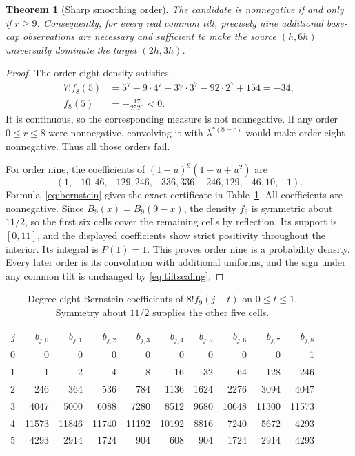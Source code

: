 \documentclass[11pt,a4paper]{article}
\newtheorem{theorem}{Theorem}[section]\newtheorem{lemma}[theorem]{Lemma}
\theoremstyle{remark}\newtheorem*{ednote}{Editorial note (ProveIt, 2026-10-01)}
\begin{document}
\begin{theorem}[Sharp smoothing order]\label{thm:nine}
The candidate is nonnegative if and only if $r\ge9$. Consequently, for every real common tilt, precisely nine additional base-cap observations are necessary and sufficient to make the source $(h,6h)$ universally dominate the target $(2h,3h)$.
\end{theorem}
\begin{proof}
The order-eight density satisfies
\begin{align*}
 7!f_8(5)
 &=5^7-9\cdot4^7+37\cdot3^7-92\cdot2^7+154=-34,\\
 f_8(5)&=-\frac{17}{2520}<0.
\end{align*}
It is continuous, so the corresponding measure is not nonnegative. If any order $0\le r\le8$ were nonnegative, convolving it with $\lambda^{*(8-r)}$ would make order eight nonnegative. Thus all those orders fail.

For order nine, the coefficients of $(1-u)^9(1-u+u^2)$ are
\[
 (1,-10,46,-129,246,-336,336,-246,129,-46,10,-1).
\]
Formula~\eqref{eq:bernstein} gives the exact certificate in Table~\ref{tab:certificate}. All coefficients are nonnegative. Since $B_9(x)=B_9(9-x)$, the density $f_9$ is symmetric about $11/2$, so the first six cells cover the remaining cells by reflection. Its support is $[0,11]$, and the displayed coefficients show strict positivity throughout the interior. Its integral is $P(1)=1$. This proves order nine is a probability density. Every later order is its convolution with additional uniforms, and the sign under any common tilt is unchanged by \eqref{eq:tiltscaling}.
\end{proof}

\begin{table}[ht]
\centering\small\setlength{\tabcolsep}{4pt}
\begin{tabular}{r|rrrrrrrrr}
\toprule
$j$ & $b_{j,0}$ & $b_{j,1}$ & $b_{j,2}$ & $b_{j,3}$ & $b_{j,4}$ & $b_{j,5}$ & $b_{j,6}$ & $b_{j,7}$ & $b_{j,8}$\\
\midrule
0&0&0&0&0&0&0&0&0&1\\
1&1&2&4&8&16&32&64&128&246\\
2&246&364&536&784&1136&1624&2276&3094&4047\\
3&4047&5000&6088&7280&8512&9680&10648&11300&11573\\
4&11573&11846&11740&11192&10192&8816&7240&5672&4293\\
5&4293&2914&1724&904&608&904&1724&2914&4293\\
\bottomrule
\end{tabular}
\caption{Degree-eight Bernstein coefficients of $8!f_9(j+t)$ on $0\le t\le1$. Symmetry about $11/2$ supplies the other five cells.}\label{tab:certificate}
\end{table}
\end{document}

